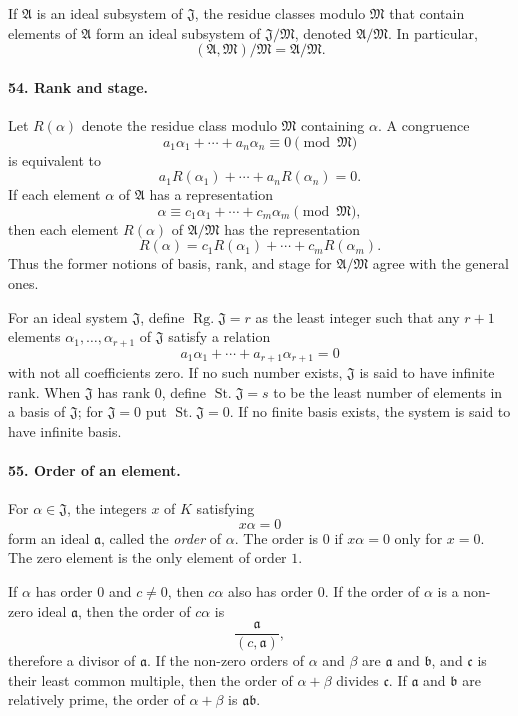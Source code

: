 \documentclass[11pt]{article}
\newcommand{\Rg}{\operatorname{Rg.}}
\newcommand{\St}{\operatorname{St.}}
\begin{document}
If $\mathfrak A$ is an ideal subsystem of $\mathfrak J$, the residue classes modulo $\mathfrak M$ that contain elements of $\mathfrak A$ form an ideal subsystem of $\mathfrak J/\mathfrak M$, denoted $\mathfrak A/\mathfrak M$. In particular,
\[
  (\mathfrak A,\mathfrak M)/\mathfrak M=\mathfrak A/\mathfrak M.
\]

\paragraph{54. Rank and stage.}
Let $R(\alpha)$ denote the residue class modulo $\mathfrak M$ containing $\alpha$. A congruence
\[
  a_1\alpha_1+\cdots+a_n\alpha_n\equiv0\pmod{\mathfrak M}
\]
is equivalent to
\[
  a_1R(\alpha_1)+\cdots+a_nR(\alpha_n)=0.
\]
If each element $\alpha$ of $\mathfrak A$ has a representation
\[
  \alpha\equiv c_1\alpha_1+\cdots+c_m\alpha_m\pmod{\mathfrak M},
\]
then each element $R(\alpha)$ of $\mathfrak A/\mathfrak M$ has the representation
\[
  R(\alpha)=c_1R(\alpha_1)+\cdots+c_mR(\alpha_m).
\]
Thus the former notions of basis, rank, and stage for $\mathfrak A/\mathfrak M$ agree with the general ones.

For an ideal system $\mathfrak J$, define $\Rg\mathfrak J=r$ as the least integer such that any $r+1$ elements $\alpha_1,
\ldots,\alpha_{r+1}$ of $\mathfrak J$ satisfy a relation
\[
  a_1\alpha_1+\cdots+a_{r+1}\alpha_{r+1}=0
\]
with not all coefficients zero. If no such number exists, $\mathfrak J$ is said to have infinite rank. When $\mathfrak J$ has rank $0$, define $\St\mathfrak J=s$ to be the least number of elements in a basis of $\mathfrak J$; for $\mathfrak J=0$ put $\St\mathfrak J=0$. If no finite basis exists, the system is said to have infinite basis.

\paragraph{55. Order of an element.}
For $\alpha\in\mathfrak J$, the integers $x$ of $K$ satisfying
\[
  x\alpha=0
\]
form an ideal $\mathfrak a$, called the \emph{order} of $\alpha$. The order is $0$ if $x\alpha=0$ only for $x=0$. The zero element is the only element of order $1$.

If $\alpha$ has order $0$ and $c\ne0$, then $c\alpha$ also has order $0$. If the order of $\alpha$ is a non-zero ideal $\mathfrak a$, then the order of $c\alpha$ is
\[
  \frac{\mathfrak a}{(c,\mathfrak a)},
\]
therefore a divisor of $\mathfrak a$. If the non-zero orders of $\alpha$ and $\beta$ are $\mathfrak a$ and $\mathfrak b$, and $\mathfrak c$ is their least common multiple, then the order of $\alpha+\beta$ divides $\mathfrak c$. If $\mathfrak a$ and $\mathfrak b$ are relatively prime, the order of $\alpha+\beta$ is $\mathfrak a\mathfrak b$.
\end{document}
